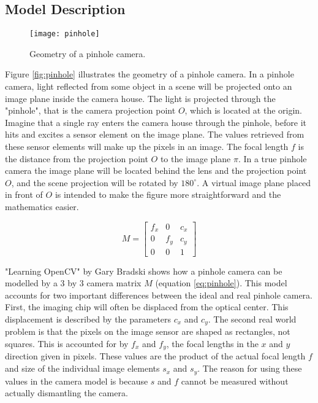 \subsection{Model Description}

\begin{wrapfigure}{r}{0.65\textwidth}
	\vspace{-10pt} %
	\centering
	\texttt{[image: pinhole]}
	\caption{\label{fig:pinhole}Geometry of a pinhole camera.}
	\vspace{-10pt} %
	\label{phantompic}
\end{wrapfigure}

Figure \ref{fig:pinhole} illustrates the geometry of a pinhole camera. In a pinhole camera, light reflected from some object in a scene will be projected onto an image plane inside the camera house. The light is projected through the "pinhole", that is the camera projection point $O$, which is located at the origin. Imagine that a single ray enters the camera house through the pinhole, before it hits and excites a sensor element on the image plane. The values retrieved from these sensor elements will make up the pixels in an image. The focal length $f$ is the distance from the projection point $O$ to the image plane $\pi$. In a true pinhole camera the image plane will be located behind the lens and the projection point $O$, and the scene projection will be rotated by $180^{\circ}$. A virtual image plane placed in front of $O$ is intended to make the figure more straightforward and the mathematics easier. 

\begin{equation}
M = \begin{bmatrix}
f_x & 0 & c_x \\
0 & f_y & c_y \\
0 & 0 & 1
\end{bmatrix}
\label{eq:pinhole}
\end{equation}

"Learning OpenCV" by Gary Bradski\cite{oreillycv} shows how a pinhole camera can be modelled by a 3 by 3 camera matrix $M$ (equation \ref{eq:pinhole}). This model accounts for two important differences between the ideal and real pinhole camera. First, the imaging chip will often be displaced from the optical center. This displacement is described by the parameters $c_x$ and $c_y$. The second real world problem is that the pixels on the image sensor are shaped as rectangles, not squares. This is accounted for by $f_x$ and $f_y$, the focal lengths in the $x$ and $y$ direction given in pixels. These values are the product of the actual focal length $f$ and size of the individual image elements $s_x$ and $s_y$. The reason for using these values in the camera model is because $s$ and $f$ cannot be measured without actually dismantling the camera\cite{oreillycv}.

